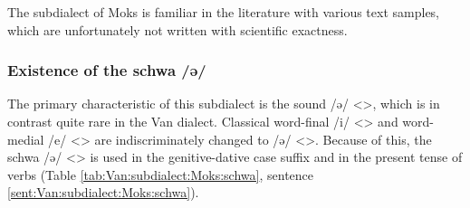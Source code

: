 The subdialect of Moks is familiar in the literature with various text samples, which are unfortunately not written with scientific exactness. 


\begin{adjarianpage}\label{page:147}\end{adjarianpage}%

\subsubsection{Existence of the schwa /ə/}
The primary characteristic of this subdialect is the sound /ə/ <>, which is in contrast quite rare in the Van dialect. Classical word-final /i/ <> and word-medial /e/ <> are indiscriminately changed to /ə/ <>. Because of this, the schwa /ə/ <> is used in the genitive-dative case suffix and in the present tense of verbs (Table \ref{tab:Van:subdialect:Moks:schwa}, sentence \ref{sent:Van:subdialect:Moks:schwa}).

\begin{table}[H]
	\centering
	\caption{Change from Classical Armenian /i, e/ <> to /ə/ <> in the Moks subdialect of the Van dialect}
	\label{tab:Van:subdialect:Moks:schwa}
\end{table} 

